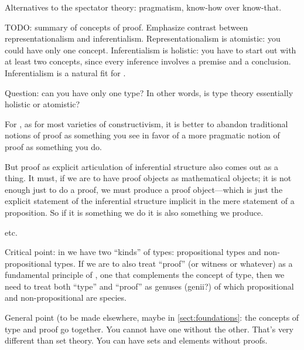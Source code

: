 Alternatives to the spectator theory: pragmatism, know-how over know-that.

\begin{ednote}
  TODO: summary of concepts of proof.  Emphasize contrast between
  representationalism and inferentialism.  Representationalism is
  atomistic: you could have only one concept.  Inferentialism is
  holistic: you have to start out with at least two concepts, since
  every inference involves a premise and a conclusion.  Inferentialism
  is a natural fit for \HoTT.

  Question: can you have only one type?  In other words, is type
  theory essentially holistic or atomistic?
\end{ednote}


For \HoTT{}, as for most varieties of constructivism, it is better to
abandon traditional notions of proof as something you see in favor of a
more pragmatic notion of proof as something you do.

\begin{ednote}
  But proof as explicit articulation of inferential structure also
  comes out as a thing.  It must, if we are to have proof objects as
  mathematical objects; it is not enough just to do a proof, we must
  produce a proof object---which is just the explicit statement of the
  inferential structure implicit in the mere statement of a
  proposition.  So if it is something we do it is also something we
  produce.
\end{ednote}

etc.

Critical point: in \HoTT we have two ``kinds'' of types: propositional
types and non-propositional types.  If we are to also treat ``proof''
(or witness or whatever) as a fundamental principle of \HoTT, one that
complements the concept of type, then we need to treat both ``type''
and ``proof'' as genuses (genii?) of which propositional and non-propositional
are species.

\begin{ednote}
  General point (to be made elsewhere, maybe in
  \cref{sect:foundations}: the concepts of type and proof go together.
  You cannot have one without the other.  That's very different than
  set theory.  You can have sets and elements without proofs.
\end{ednote}



